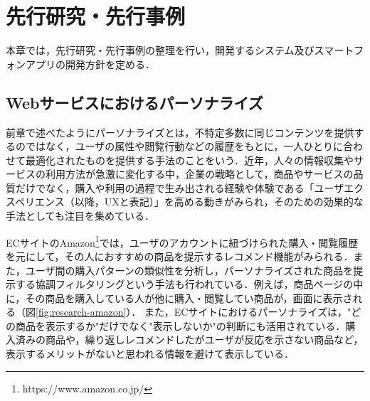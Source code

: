 \documentclass[a4paper]{jsarticle}
\begin{document}
\section{先行研究・先行事例}
本章では，先行研究・先行事例の整理を行い，開発するシステム及びスマートフォンアプリの開発方針を定める．

\subsection{Webサービスにおけるパーソナライズ}
前章で述べたようにパーソナライズとは，不特定多数に同じコンテンツを提供するのではなく，ユーザの属性や閲覧行動などの履歴をもとに，一人ひとりに合わせて最適化されたものを提供する手法のことをいう．近年，人々の情報収集やサービスの利用方法が急激に変化する中，企業の戦略として，商品やサービスの品質だけでなく，購入や利用の過程で生み出される経験や体験である「ユーザエクスペリエンス（以降，UXと表記）」を高める動きがみられ，そのための効果的な手法としても注目を集めている\cite{izumi}．



ECサイトのAmazon\footnote{https://www.amazon.co.jp/}では，ユーザのアカウントに紐づけられた購入・閲覧履歴を元にして，その人におすすめの商品を提示するレコメンド機能がみられる．また，ユーザ間の購入パターンの類似性を分析し，パーソナライズされた商品を提示する協調フィルタリングという手法も行われている．例えば，商品ページの中に，その商品を購入している人が他に購入・閲覧してい商品が，画面に表示される（図\ref{fig:research-amazon}）．
また，ECサイトにおけるパーソナライズは，"どの商品を表示するか"だけでなく"表示しないか"の判断にも活用されている．購入済みの商品や，繰り返しレコメンドしたがユーザが反応を示さない商品など，表示するメリットがないと思われる情報を避けて表示している．
\end{document}
